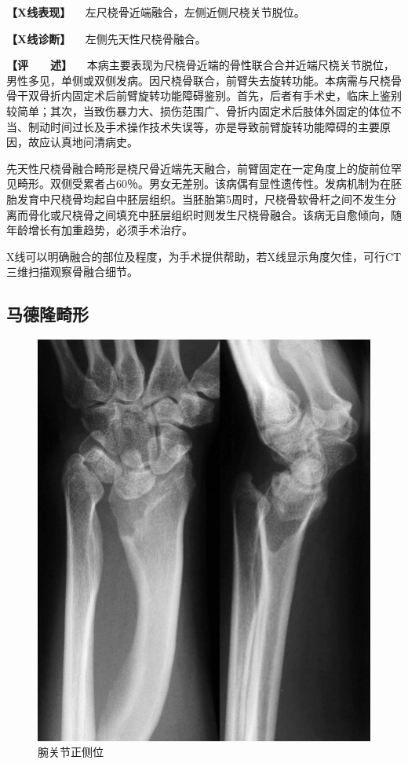 \textbf{【X线表现】} 　左尺桡骨近端融合，左侧近侧尺桡关节脱位。

\textbf{【X线诊断】} 　左侧先天性尺桡骨融合。

\textbf{【评　　述】}
　本病主要表现为尺桡骨近端的骨性联合合并近端尺桡关节脱位，男性多见，单侧或双侧发病。因尺桡骨联合，前臂失去旋转功能。本病需与尺桡骨骨干双骨折内固定术后前臂旋转功能障碍鉴别。首先，后者有手术史，临床上鉴别较简单；其次，当致伤暴力大、损伤范围广、骨折内固定术后肢体外固定的体位不当、制动时间过长及手术操作技术失误等，亦是导致前臂旋转功能障碍的主要原因，故应认真地问清病史。

先天性尺桡骨融合畸形是桡尺骨近端先天融合，前臂固定在一定角度上的旋前位罕见畸形。双侧受累者占60％。男女无差别。该病偶有显性遗传性。发病机制为在胚胎发育中尺桡骨均起自中胚层组织。当胚胎第5周时，尺桡骨软骨杆之间不发生分离而骨化或尺桡骨之间填充中胚层组织时则发生尺桡骨融合。该病无自愈倾向，随年龄增长有加重趋势，必须手术治疗。

X线可以明确融合的部位及程度，为手术提供帮助，若X线显示角度欠佳，可行CT三维扫描观察骨融合细节。

\subsection{马德隆畸形}

\begin{figure}[!htbp]
 \centering
 \includegraphics{./images/Image00023.jpg}
 \captionsetup{justification=centering}
 \caption{腕关节正侧位}
 \label{fig2-2-6}
  \end{figure} 


